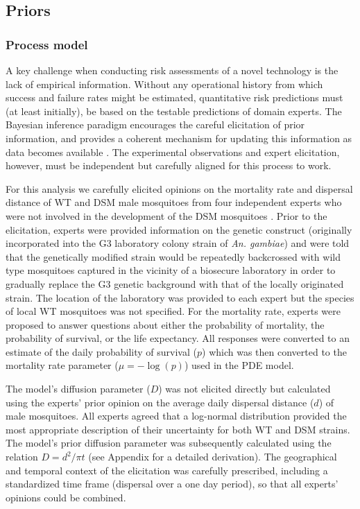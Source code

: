 \documentclass[]{bmcart}
\newcommand{\vd}{{D}}
\begin{document}
\subsection{Priors}
\subsubsection{Process model}
A key challenge when conducting risk assessments of a novel technology is the lack of empirical information. Without any operational history from which success and failure rates might be estimated, quantitative risk predictions must (at least initially), be based on the testable predictions of domain experts. The Bayesian inference paradigm encourages the careful elicitation of prior information, and provides a coherent mechanism for updating this information as data becomes available \citep{Lindley2000}. The experimental observations and expert elicitation, however, must be independent but carefully aligned for this process to work.

For this analysis we carefully elicited opinions on the mortality rate and dispersal distance of WT and DSM male mosquitoes from four independent experts who were not involved in the development of the DSM mosquitoes \cite{Hayes2015a}. Prior to the elicitation, experts were provided information on the genetic construct (originally incorporated into the G3 laboratory colony strain of \textit{An. gambiae}) and were told that the genetically modified strain would be repeatedly backcrossed with wild type mosquitoes captured in the vicinity of a biosecure laboratory in order to gradually replace the G3 genetic background with that of the locally originated strain. The location of the laboratory was provided to each expert but the species of local WT mosquitoes was not specified. For the mortality rate, experts were proposed to answer questions about either the probability of mortality, the probability of survival, or the life expectancy. All responses were converted to an estimate of the daily probability of survival ($p$) which was then converted to the mortality rate parameter ($\mu = -\log(p)$) used in the PDE model.

The model's diffusion parameter ($\vd$) was not elicited directly but calculated using the experts' prior opinion on the average daily dispersal distance ($d$) of male mosquitoes. All experts agreed that a log-normal distribution provided the most appropriate description of their uncertainty for both WT and DSM strains. The model's prior diffusion parameter was subsequently calculated using the relation $\vd = d^2/\pi t$ (see Appendix for a detailed derivation). The geographical and temporal context of the elicitation was carefully prescribed, including a standardized time frame (dispersal over a one day period), so that all experts' opinions could be combined.
\end{document}
